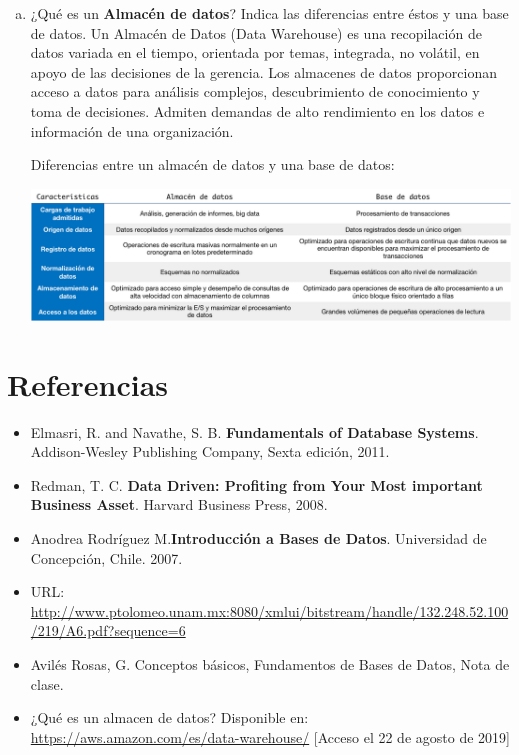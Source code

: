 \documentclass[letterpaper,12pt]{article}
\begin{document}
\begin{enumerate}[a)]
\begin{itemize}
          \end{itemize}




            \item ¿Qué es un \textbf{Almacén de datos}? Indica las diferencias entre éstos y una base de datos.
            Un Almacén de Datos (Data Warehouse) es una recopilación de datos variada en el tiempo, orientada por temas, integrada, 
            no volátil, en apoyo de las decisiones de la gerencia. Los almacenes de datos proporcionan acceso a datos para análisis complejos, descubrimiento de conocimiento y toma de decisiones. 
            Admiten demandas de alto rendimiento en los datos e información de una organización. 

            Diferencias entre un almacén de datos y una base de datos:
            
            \includegraphics[width=\textwidth]{imagenes/diferencias.png}
            \end{enumerate}


            \section*{Referencias}
            \begin{itemize}

            	\item Elmasri, R. and Navathe, S. B. \textbf{Fundamentals of Database Systems}. Addison-Wesley Publishing Company, Sexta edición, 2011.
            	\item Redman, T. C. \textbf{Data Driven: Profiting from Your Most important Business Asset}. Harvard Business Press, 2008.

              \item Anodrea Rodríguez M.\textbf{Introducción a Bases de Datos}. Universidad de Concepción, Chile. 2007.

              \item URL: \url{http://www.ptolomeo.unam.mx:8080/xmlui/bitstream/handle/132.248.52.100/219/A6.pdf?sequence=6}

              \item Avilés Rosas, G. Conceptos básicos, Fundamentos de Bases de Datos, Nota de clase.
              \item ¿Qué es un almacen de datos? Disponible en: \url{https://aws.amazon.com/es/data-warehouse/} [Acceso el 22 de agosto de 2019]



            \end{itemize}

            
\end{document}
